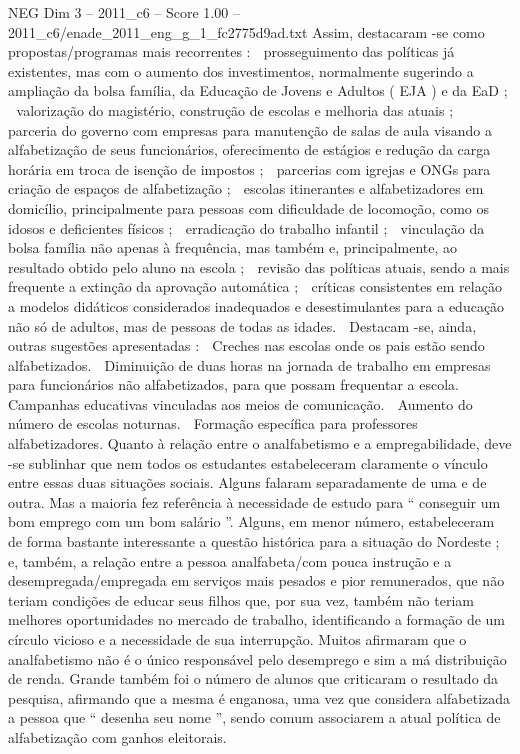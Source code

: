 \begin{textsample}{NEG Dim 3 – 2011\_c6 – Score 1.00 – 2011\_c6/enade\_2011\_eng\_g\_1\_fc2775d9ad.txt}
Assim, destacaram -se como propostas/programas mais recorrentes :  prosseguimento das políticas já existentes, mas com o aumento dos investimentos, normalmente sugerindo a ampliação da bolsa família, da Educação de Jovens e Adultos ( EJA ) e da EaD ;  valorização do magistério, construção de escolas e melhoria das atuais ;  parceria do governo com empresas para manutenção de salas de aula visando a alfabetização de seus funcionários, oferecimento de estágios e redução da carga horária em troca de isenção de impostos ;  parcerias com igrejas e ONGs para criação de espaços de alfabetização ;  escolas itinerantes e alfabetizadores em domicílio, principalmente para pessoas com dificuldade de locomoção, como os idosos e deficientes físicos ;  erradicação do trabalho infantil ;  vinculação da bolsa família não apenas à frequência, mas também e, principalmente, ao resultado obtido pelo aluno na escola ;  revisão das políticas atuais, sendo a mais frequente a extinção da aprovação automática ;  críticas consistentes em relação a modelos didáticos considerados inadequados e desestimulantes para a educação não só de adultos, mas de pessoas de todas as idades.  Destacam -se, ainda, outras sugestões apresentadas :  Creches nas escolas onde os pais estão sendo alfabetizados.  Diminuição de duas horas na jornada de trabalho em empresas para funcionários não alfabetizados, para que possam frequentar a escola.  Campanhas educativas vinculadas aos meios de comunicação.  Aumento do número de escolas noturnas.  Formação específica para professores alfabetizadores.
Quanto à relação entre o analfabetismo e a empregabilidade, deve -se sublinhar que nem todos os estudantes estabeleceram claramente o vínculo entre essas duas situações sociais.
Alguns falaram separadamente de uma e de outra.
Mas a maioria fez referência à necessidade de estudo para “ conseguir um bom emprego com um bom salário ”.
Alguns, em menor número, estabeleceram de forma bastante interessante a questão histórica para a situação do Nordeste ; e, também, a relação entre a pessoa analfabeta/com pouca instrução e a desempregada/empregada em serviços mais pesados e pior remunerados, que não teriam condições de educar seus filhos que, por sua vez, também não teriam melhores oportunidades no mercado de trabalho, identificando a formação de um círculo vicioso e a necessidade de sua interrupção.
Muitos afirmaram que o analfabetismo não é o único responsável pelo desemprego e sim a má distribuição de renda.
Grande também foi o número de alunos que criticaram o resultado da pesquisa, afirmando que a mesma é enganosa, uma vez que considera alfabetizada a pessoa que “ desenha seu nome ”, sendo comum associarem a atual política de alfabetização com ganhos eleitorais.

\end{textsample}
